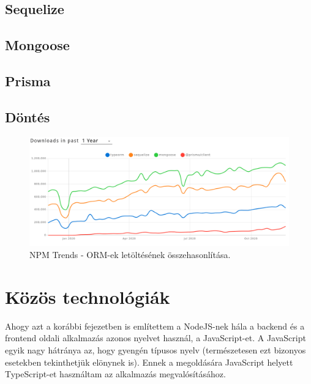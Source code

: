 \subsection{Sequelize}

\subsection{Mongoose}

\subsection{Prisma}

\subsection{Döntés}


\begin{figure}[!ht]
  \centering
  \includegraphics[width=150mm, keepaspectratio]{figures/orm_npm_trends.png}
  \caption{NPM Trends - ORM-ek letöltésének összehasonlítása.}
  \label{fig:ORMTrends}
\end{figure}

\section{Közös technológiák}
Ahogy azt a korábbi fejezetben is említettem a NodeJS-nek hála a backend és a frontend oldali alkalmazás azonos nyelvet használ, a JavaScript-et.
A JavaScript egyik nagy hátránya az, hogy gyengén típusos nyelv (természetesen ezt bizonyos esetekben tekinthetjük elönynek is). Ennek a megoldására JavaScript helyett TypeScript-et használtam az alkalmazás megvalósításához.

